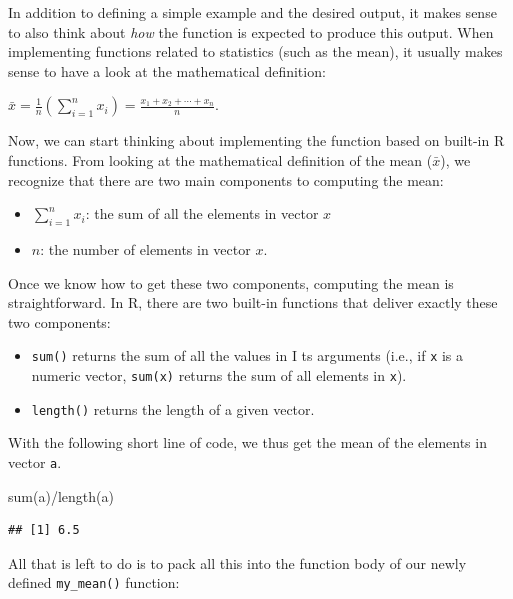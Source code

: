 \documentclass[
  12pt,
]{style/krantz}
\newenvironment{Shaded}{\begin{snugshade}}{\end{snugshade}}
\newcommand{\FunctionTok}[1]{\textcolor[rgb]{0.00,0.00,0.00}{#1}}
\newcommand{\NormalTok}[1]{#1}
\newcommand{\SpecialCharTok}[1]{\textcolor[rgb]{0.00,0.00,0.00}{#1}}
\providecommand{\tightlist}{%
  \setlength{\itemsep}{0pt}\setlength{\parskip}{0pt}}
\begin{document}
In addition to defining a simple example and the desired output, it makes sense to also think about \emph{how} the function is expected to produce this output. When implementing functions related to statistics (such as the mean), it usually makes sense to have a look at the mathematical definition:

\(\bar{x} = \frac{1}{n}\left (\sum_{i=1}^n{x_i}\right ) = \frac{x_1+x_2+\cdots +x_n}{n}\).

Now, we can start thinking about implementing the function based on built-in R functions. From looking at the mathematical definition of the mean (\(\bar{x}\)), we recognize that there are two main components to computing the mean:

\begin{itemize}
\tightlist
\item
  \(\sum_{i=1}^n{x_i}\): the sum of all the elements in vector \(x\)
\item
  \(n\): the number of elements in vector \(x\).
\end{itemize}

Once we know how to get these two components, computing the mean is straightforward. In R, there are two built-in functions that deliver exactly these two components:

\begin{itemize}
\tightlist
\item
  \texttt{sum()} returns the sum of all the values in I ts arguments (i.e., if \texttt{x} is a numeric vector, \texttt{sum(x)} returns the sum of all elements in \texttt{x}).
\item
  \texttt{length()} returns the length of a given vector.
\end{itemize}

With the following short line of code, we thus get the mean of the elements in vector \texttt{a}.

\begin{Shaded}
\begin{Highlighting}[]
\FunctionTok{sum}\NormalTok{(a)}\SpecialCharTok{/}\FunctionTok{length}\NormalTok{(a)}
\end{Highlighting}
\end{Shaded}

\begin{verbatim}
## [1] 6.5
\end{verbatim}

All that is left to do is to pack all this into the function body of our newly defined \texttt{my\_mean()} function:
\end{document}
